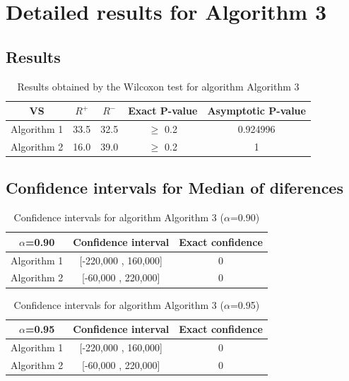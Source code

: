 \documentclass[a4paper,10pt]{article}
\begin{document}
 \clearpage 


\section{Detailed results for Algorithm 3}


\subsection{Results}

\begin{table}[!htp]
\centering\small
\begin{tabular}{
|c|c|c|c|c|}
\hline
 VS & $R^{+}$ & $R^{-}$ & Exact P-value & Asymptotic P-value \\ \hline 
Algorithm 1 & 33.5 & 32.5 & $\geq$ 0.2 & 0.924996\\ \hline 
Algorithm 2 & 16.0 & 39.0 & $\geq$ 0.2 & 1\\ \hline 

\end{tabular}
\caption{Results obtained by the Wilcoxon test for algorithm Algorithm 3}
\end{table}

\subsection{Confidence intervals for Median of diferences}

\begin{table}[!htp]
\centering\small
\begin{tabular}{
|c|c|c|}
\hline
 $\alpha$=0.90 & Confidence interval & Exact confidence \\ \hline 
Algorithm 1 & [-220,000 , 160,000] & 0\\ \hline 
Algorithm 2 & [-60,000 , 220,000] & 0\\ \hline 

\end{tabular}
\caption{Confidence intervals for algorithm Algorithm 3 ($\alpha$=0.90)}
\end{table}
\begin{table}[!htp]
\centering\small
\begin{tabular}{
|c|c|c|}
\hline
 $\alpha$=0.95 & Confidence interval & Exact confidence \\ \hline 
Algorithm 1 & [-220,000 , 160,000] & 0\\ \hline 
Algorithm 2 & [-60,000 , 220,000] & 0\\ \hline 

\end{tabular}
\caption{Confidence intervals for algorithm Algorithm 3 ($\alpha$=0.95)}
\end{table}

 \clearpage 
\end{document}
